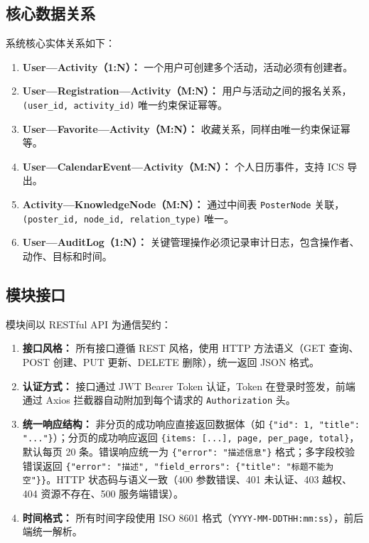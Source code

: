 \documentclass[12pt,a4paper]{ctexart}
\begin{document}
\subsection{核心数据关系}
系统核心实体关系如下：
\begin{enumerate}
\item \textbf{User—Activity（1:N）：} 一个用户可创建多个活动，活动必须有创建者。
\item \textbf{User—Registration—Activity（M:N）：} 用户与活动之间的报名关系，\texttt{(user\_id, activity\_id)} 唯一约束保证幂等。
\item \textbf{User—Favorite—Activity（M:N）：} 收藏关系，同样由唯一约束保证幂等。
\item \textbf{User—CalendarEvent—Activity（M:N）：} 个人日历事件，支持 ICS 导出。
\item \textbf{Activity—KnowledgeNode（M:N）：} 通过中间表 \texttt{PosterNode} 关联，\texttt{(poster\_id, node\_id, relation\_type)} 唯一。
\item \textbf{User—AuditLog（1:N）：} 关键管理操作必须记录审计日志，包含操作者、动作、目标和时间。
\end{enumerate}

\subsection{模块接口}
模块间以 RESTful API 为通信契约：
\begin{enumerate}
\item \textbf{接口风格：} 所有接口遵循 REST 风格，使用 HTTP 方法语义（GET 查询、POST 创建、PUT 更新、DELETE 删除），统一返回 JSON 格式。
\item \textbf{认证方式：} 接口通过 JWT Bearer Token 认证，Token 在登录时签发，前端通过 Axios 拦截器自动附加到每个请求的 \texttt{Authorization} 头。
\item \textbf{统一响应结构：} 非分页的成功响应直接返回数据体（如 \texttt{\{"id": 1, "title": "..."\}}）；分页的成功响应返回 \texttt{\{items: [...], page, per\_page, total\}}，默认每页 20 条。错误响应统一为 \texttt{\{"error": "描述信息"\}} 格式；多字段校验错误返回 \texttt{\{"error": "描述", "field\_errors": \{"title": "标题不能为空"\}\}}。HTTP 状态码与语义一致（400 参数错误、401 未认证、403 越权、404 资源不存在、500 服务端错误）。
\item \textbf{时间格式：} 所有时间字段使用 ISO 8601 格式（\texttt{YYYY-MM-DDTHH:mm:ss}），前后端统一解析。
\end{enumerate}
\end{document}

